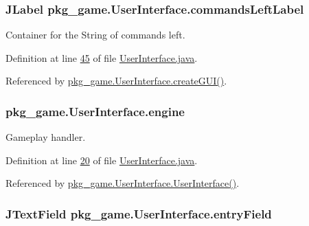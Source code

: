 \hypertarget{classpkg__game_1_1UserInterface_a8ffc0ac7b194efdbb234aafefe1297b9}{
\subsubsection[{commands\-Left\-Label}]{\setlength{\rightskip}{0pt plus 5cm}J\-Label pkg\-\_\-game.\-User\-Interface.\-commands\-Left\-Label\hspace{0.3cm}{\ttfamily [private]}}}\label{classpkg__game_1_1UserInterface_a8ffc0ac7b194efdbb234aafefe1297b9}


Container for the String of commands left. 



Definition at line \hyperlink{UserInterface_8java_source_l00045}{45} of file \hyperlink{UserInterface_8java_source}{User\-Interface.\-java}.



Referenced by \hyperlink{UserInterface_8java_source_l00123}{pkg\-\_\-game.\-User\-Interface.\-create\-G\-U\-I()}.

\hypertarget{classpkg__game_1_1UserInterface_aa212a563cd1a7c42210b8843429d7977}{
\subsubsection[{engine}]{ pkg\-\_\-game.\-User\-Interface.\-engine\hspace{0.3cm}{\ttfamily [private]}}}\label{classpkg__game_1_1UserInterface_aa212a563cd1a7c42210b8843429d7977}


Gameplay handler. 



Definition at line \hyperlink{UserInterface_8java_source_l00020}{20} of file \hyperlink{UserInterface_8java_source}{User\-Interface.\-java}.



Referenced by \hyperlink{UserInterface_8java_source_l00056}{pkg\-\_\-game.\-User\-Interface.\-User\-Interface()}.

\hypertarget{classpkg__game_1_1UserInterface_ae405fc2ad81ccf31aad56484a9c1c2bc}{
\subsubsection[{entry\-Field}]{\setlength{\rightskip}{0pt plus 5cm}J\-Text\-Field pkg\-\_\-game.\-User\-Interface.\-entry\-Field\hspace{0.3cm}{\ttfamily [private]}}}\label{classpkg__game_1_1UserInterface_ae405fc2ad81ccf31aad56484a9c1c2bc}


